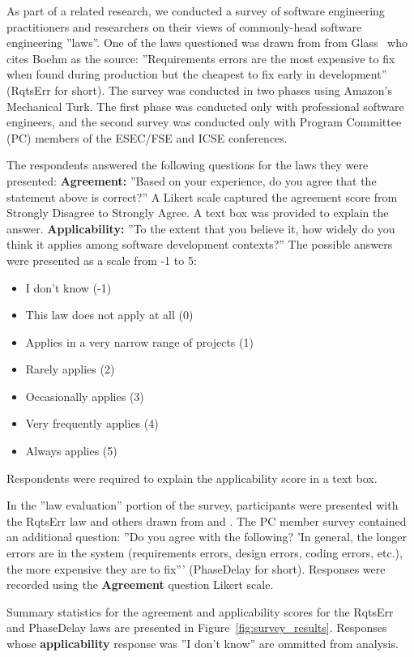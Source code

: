 As part of a related research, we conducted a survey of software engineering practitioners and researchers on their views of commonly-head software engineering ''laws''. One of the laws questioned was drawn from from Glass~\cite{glass02} who cites Boehm  as the source: ''Requirements errors are the most expensive to fix when found during production but the cheapest to fix early in development'' (RqtsErr for short). The survey was conducted in two phases using Amazon's Mechanical Turk. The first phase was conducted only with professional software engineers, and the second survey was conducted only with Program Committee (PC) members of the ESEC/FSE and ICSE conferences.

The respondents answered the following questions for the laws they were presented: 
\textbf{Agreement:} ''Based on your experience, do you agree that the statement above is correct?'' A Likert scale captured the agreement score from Strongly Disagree to Strongly Agree. A text box was provided to explain the answer.
\textbf{Applicability:} ''To the extent that you believe it, how widely do you think it applies among software development contexts?'' The possible answers were presented as a scale from -1 to 5:
\begin{itemize}
\item I don't know (-1)
\item This law does not apply at all (0)
\item Applies in a very narrow range of projects  (1)
\item Rarely applies (2)
\item Occasionally applies (3)
\item Very frequently applies (4)
\item Always applies (5)
\end{itemize}
Respondents were required to explain the applicability score in a text box.

In the ''law evaluation'' portion of the survey, participants were presented with the RqtsErr law and others drawn from \cite{glass02} and \cite{endres03}. The PC member survey contained an additional question: ''Do you agree with the following? 'In general, the longer errors are in the system (requirements errors, design errors, coding errors, etc.), the more expensive they are to fix''' (PhaseDelay for short). Responses were recorded using the \textbf{Agreement} question Likert scale. 

Summary statistics for the agreement and applicability scores for the RqtsErr and PhaseDelay laws are presented in Figure~\ref{fig:survey_results}. Responses whose \textbf{applicability} response was ''I don't know'' are ommitted from analysis.


